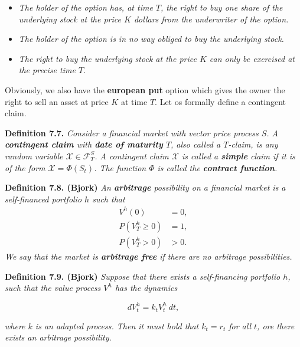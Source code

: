 \documentclass[
]{book}
\providecommand{\tightlist}{%
  \setlength{\itemsep}{0pt}\setlength{\parskip}{0pt}}
\begin{document}
\begin{itemize}
\tightlist
\item
  \emph{The holder of the option has, at time \(T\), the right to buy one share of the underlying stock at the price \(K\) dollars from the underwriter of the option.}
\item
  \emph{The holder of the option is in no way obliged to buy the underlying stock.}
\item
  \emph{The right to buy the underlying stock at the price \(K\) can only be exercised at the precise time \(T\).}
\end{itemize}

Obviously, we also have the \textbf{european put} option which gives the owner the right to sell an asset at price \(K\) at time \(T\). Let os formally define a contingent claim.

\textbf{Definition 7.7.} \emph{Consider a financial market with vector price process \(S\). A \textbf{contingent claim} with \textbf{date of maturity} \(T\), also called a \(T\)-claim, is any random variable \(\mathcal{X}\in\mathcal{F}_T^S\). A contingent claim \(\mathcal{X}\) is called a \textbf{simple} claim if it is of the form \(\mathcal{X} = \Phi(S_t)\). The function \(\Phi\) is called the \textbf{contract function}.}

\textbf{Definition 7.8. (Bjork)} \emph{An \textbf{arbitrage} possibility on a financial market is a self-financed portfolio \(h\) such that}
\begin{align*}
V^h(0)&=0,\tag{7.13}\\
P(V_T^h\ge0)&=1,\tag{7-14}\\
P(V_T^h>0)&>0.\tag{7.15}
\end{align*}
\emph{We say that the market is \textbf{arbitrage free} if there are no arbitrage possibilities.}

\textbf{Definition 7.9. (Bjork)} \emph{Suppose that there exists a self-financing portfolio \(h\), such that the value process \(V^h\) has the dynamics}

\[
d V_t^h=k_tV_t^h\ dt,\tag{7.16}
\]

\emph{where \(k\) is an adapted process. Then it must hold that \(k_t=r_t\) for all \(t\), ore there exists an arbitrage possibility.}
\end{document}
